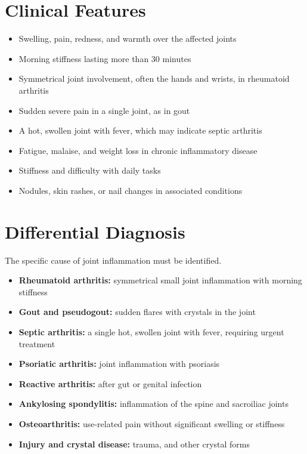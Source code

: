 \section*{Clinical Features}
\begin{itemize}
    \item Swelling, pain, redness, and warmth over the affected joints
    \item Morning stiffness lasting more than 30 minutes
    \item Symmetrical joint involvement, often the hands and wrists, in rheumatoid arthritis
    \item Sudden severe pain in a single joint, as in gout
    \item A hot, swollen joint with fever, which may indicate septic arthritis
    \item Fatigue, malaise, and weight loss in chronic inflammatory disease
    \item Stiffness and difficulty with daily tasks
    \item Nodules, skin rashes, or nail changes in associated conditions
\end{itemize}

\section*{Differential Diagnosis}
The specific cause of joint inflammation must be identified.
\begin{itemize}
    \item \textbf{Rheumatoid arthritis:} symmetrical small joint inflammation with morning stiffness
    \item \textbf{Gout and pseudogout:} sudden flares with crystals in the joint
    \item \textbf{Septic arthritis:} a single hot, swollen joint with fever, requiring urgent treatment
    \item \textbf{Psoriatic arthritis:} joint inflammation with psoriasis
    \item \textbf{Reactive arthritis:} after gut or genital infection
    \item \textbf{Ankylosing spondylitis:} inflammation of the spine and sacroiliac joints
    \item \textbf{Osteoarthritis:} use-related pain without significant swelling or stiffness
    \item \textbf{Injury and crystal disease:} trauma, and other crystal forms
\end{itemize}

